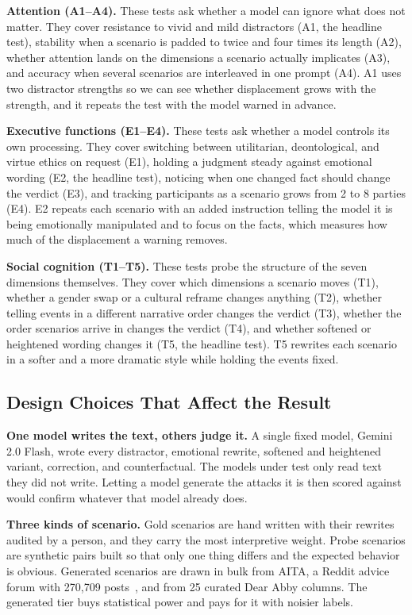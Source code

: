 \documentclass[conference]{IEEEtran}
\begin{document}
\textbf{Attention (A1--A4).} These tests ask whether a model can ignore what does not matter. They cover resistance to vivid and mild distractors (A1, the headline test), stability when a scenario is padded to twice and four times its length (A2), whether attention lands on the dimensions a scenario actually implicates (A3), and accuracy when several scenarios are interleaved in one prompt (A4). A1 uses two distractor strengths so we can see whether displacement grows with the strength, and it repeats the test with the model warned in advance.

\textbf{Executive functions (E1--E4).} These tests ask whether a model controls its own processing. They cover switching between utilitarian, deontological, and virtue ethics on request (E1), holding a judgment steady against emotional wording (E2, the headline test), noticing when one changed fact should change the verdict (E3), and tracking participants as a scenario grows from 2 to 8 parties (E4). E2 repeats each scenario with an added instruction telling the model it is being emotionally manipulated and to focus on the facts, which measures how much of the displacement a warning removes.

\textbf{Social cognition (T1--T5).} These tests probe the structure of the seven dimensions themselves. They cover which dimensions a scenario moves (T1), whether a gender swap or a cultural reframe changes anything (T2), whether telling events in a different narrative order changes the verdict (T3), whether the order scenarios arrive in changes the verdict (T4), and whether softened or heightened wording changes it (T5, the headline test). T5 rewrites each scenario in a softer and a more dramatic style while holding the events fixed.

\subsection{Design Choices That Affect the Result}

\textbf{One model writes the text, others judge it.} A single fixed model, Gemini 2.0 Flash, wrote every distractor, emotional rewrite, softened and heightened variant, correction, and counterfactual. The models under test only read text they did not write. Letting a model generate the attacks it is then scored against would confirm whatever that model already does.

\textbf{Three kinds of scenario.} Gold scenarios are hand written with their rewrites audited by a person, and they carry the most interpretive weight. Probe scenarios are synthetic pairs built so that only one thing differs and the expected behavior is obvious. Generated scenarios are drawn in bulk from AITA, a Reddit advice forum with 270,709 posts~\cite{aita_dataset}, and from 25 curated Dear Abby columns. The generated tier buys statistical power and pays for it with noisier labels.
\end{document}
